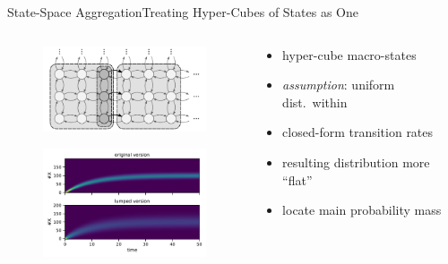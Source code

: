 \documentclass[10pt]{beamer}
\newcommand{\bottomcite}[1]{\vspace*{\fill} {\scriptsize \parencite{#1}}}
\begin{document}
\begin{frame}{State-Space Aggregation}{Treating Hyper-Cubes of States as One}
    \begin{columns}
        \begin{column}{.4\textwidth}
            \begin{figure}
            \includegraphics[width=5cm]{../gfx/macro_states.pdf}
            \end{figure}
            \begin{figure}
                \includegraphics[width=50mm]{../gfx/lumpedvorig.pdf}
            \end{figure}
        \end{column}
        \begin{column}{.6\textwidth}
            \begin{itemize}
                \item hyper-cube macro-states
                \item \emph{assumption}: uniform dist.\ within
                \item closed-form transition rates
            \end{itemize}
            \vspace{17mm}
            \begin{itemize}
                \item resulting distribution more ``flat''
                \item locate main probability mass
            \end{itemize}
            \vspace{4mm}
        \end{column}
    \end{columns}
    \bottomcite{backenkohler2020analysis,backenkohler2021abstraction}
\end{frame}
\end{document}
